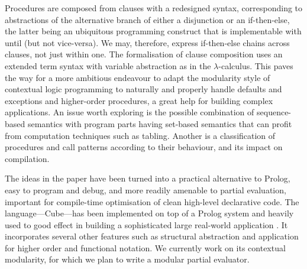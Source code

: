 \documentclass{tlp}
\newcommand{\cube}{\textsf{Cube}}
\def\munt{\textsf{until}}
\def\mite{\textsf{if-then-else}}
\begin{document}
Procedures are composed from clauses with a redesigned syntax, corresponding to
abstractions of the alternative branch of either a disjunction or an \mite, the
latter being an ubiquitous programming construct that is implementable with
\munt{} (but not vice-versa). We may, therefore, express \mite{} chains across clauses, not
just within one. The formalisation of clause composition uses an extended term
syntax with variable abstraction as in the $\lambda$-calculus. This paves the way
for a more ambitious endeavour to adapt the modularity style of contextual logic
programming \cite{mo_po:89:clp} to naturally and properly handle defaults and
exceptions and higher-order procedures, a great help for building complex
applications.  An issue worth exploring is the possible combination of
sequence-based semantics with program parts having set-based semantics that can
profit from computation techniques such as tabling. Another is a classification
of procedures and call patterns according to their behaviour, and its impact on
compilation.

The ideas in the paper have been turned into a practical alternative to Prolog, easy to
program and debug, and more readily amenable to partial evaluation,
important for compile-time optimisation of clean high-level declarative code. The
language---\cube{}---has been implemented on top of a Prolog system and heavily
used to good effect in building a sophisticated large real-world application
\cite{po:03:iispp}.  It incorporates several other features such as structural
abstraction and application \cite{po:02:saalp} for higher order and functional
notation.  We currently work on its contextual modularity, for which we plan to write a modular
partial evaluator.


\end{document}
